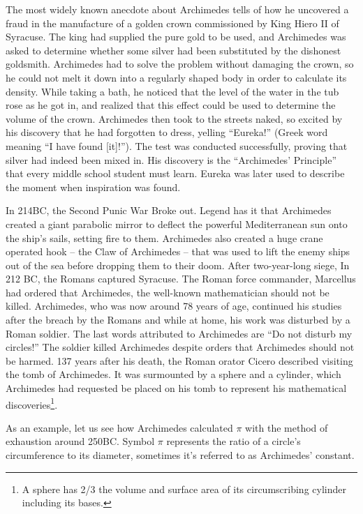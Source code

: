 \documentclass{article}
\begin{document}
The most widely known anecdote about Archimedes tells of how he uncovered a fraud in the manufacture of a golden crown commissioned by King Hiero II of Syracuse. The king had supplied the pure gold to be used, and Archimedes was asked to determine whether some silver had been substituted by the dishonest goldsmith. Archimedes had to solve the problem without damaging the crown, so he could not melt it down into a regularly shaped body in order to calculate its density. While taking a bath, he noticed that the level of the water in the tub rose as he got in, and realized that this effect could be used to determine the volume of the crown. Archimedes then took to the streets naked, so excited by his discovery that he had forgotten to dress, yelling ``Eureka!'' (Greek word meaning ``I have found [it]!''). The test was conducted successfully, proving that silver had indeed been mixed in. His discovery is the ``Archimedes' Principle'' that every middle school student must learn. Eureka was later used to describe the moment when inspiration was found.

In 214BC, the Second Punic War Broke out. Legend has it that Archimedes created a giant parabolic mirror to deflect the powerful Mediterranean sun onto the ship's sails, setting fire to them. Archimedes also created a huge crane operated hook – the Claw of Archimedes – that was used to lift the enemy ships out of the sea before dropping them to their doom. After two-year-long siege, In 212 BC, the Romans captured Syracuse. The Roman force commander, Marcellus had ordered that Archimedes, the well-known mathematician should not be killed. Archimedes, who was now around 78 years of age, continued his studies after the breach by the Romans and while at home, his work was disturbed by a Roman soldier. The last words attributed to Archimedes are ``Do not disturb my circles!'' The soldier killed Archimedes despite orders that Archimedes should not be harmed. 137 years after his death, the Roman orator Cicero described visiting the tomb of Archimedes. It was surmounted by a sphere and a cylinder, which Archimedes had requested be placed on his tomb to represent his mathematical discoveries\footnote{A sphere has 2/3 the volume and surface area of its circumscribing cylinder including its bases.}.


As an example, let us see how Archimedes calculated $\pi$ with the method of exhaustion around 250BC. Symbol $\pi$ represents the ratio of a circle's circumference to its diameter, sometimes it's referred to as Archimedes' constant.
\end{document}
